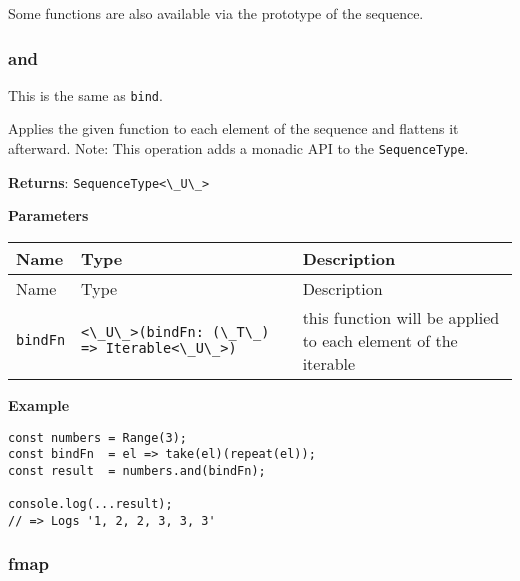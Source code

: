 Some functions are also available via the prototype of the sequence.

\hypertarget{4e16908d-1d8b-4712-9b4c-00431a8bdb0c}{%
\subsubsection{and}\label{4e16908d-1d8b-4712-9b4c-00431a8bdb0c}}

This is the same as \passthrough{\lstinline!bind!}.

Applies the given function to each element of the sequence and flattens
it afterward. Note: This operation adds a monadic API to the
\passthrough{\lstinline!SequenceType!}.

\textbf{Returns}: \passthrough{\lstinline!SequenceType<\_U\_>!}

\textbf{Parameters}

\begin{longtable}[]{
  >{\raggedright\arraybackslash}p{}
  >{\raggedright\arraybackslash}p{}
  >{\raggedright\arraybackslash}p{}@{}}

\toprule\noalign{}
Name & Type & Description \\
\midrule\noalign{}
\endfirsthead
\toprule\noalign{}
Name & Type & Description \\
\midrule\noalign{}
\endhead
\bottomrule\noalign{}
\endlastfoot
\passthrough{\lstinline!bindFn!} &
\passthrough{\lstinline!<\_U\_>(bindFn: (\_T\_) => Iterable<\_U\_>)!} &
this function will be applied to each element of the iterable \\
\end{longtable}

\textbf{Example}

\begin{lstlisting}[label=18e442c6-6467-4e19-bc9b-7679259b6817]
const numbers = Range(3);
const bindFn  = el => take(el)(repeat(el));
const result  = numbers.and(bindFn);
                                           
console.log(...result);
// => Logs '1, 2, 2, 3, 3, 3'
\end{lstlisting}

\hypertarget{24c00685-c1a1-48d1-9430-91d7bb8d798a}{%
\subsubsection{fmap}\label{24c00685-c1a1-48d1-9430-91d7bb8d798a}}

